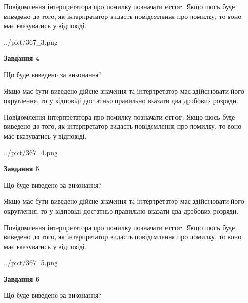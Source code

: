 \documentclass[12pt, ukrainian]{article}
\begin{document}
{\begin {Large}
Повідомлення інтерпретатора про помилку позначати \textbf{error}.
Якщо щось буде виведено до того, як інтерпретатор видасть повідомлення про помилку, 
то воно має вказуватись у відповіді. \par

\begin{center}
	{../pict/367_3.png}
\end{center}
\newpage

{\begin {center}\textbf{Завдання 4}\end {center}}\par
Що буде виведено за виконання? \par

Якщо має бути виведено дійсне значення та інтерпретатор має здійснювати його округлення, 
то у відповіді достатньо правильно вказати два дробових розряди.

Повідомлення інтерпретатора про помилку позначати \textbf{error}.
Якщо щось буде виведено до того, як інтерпретатор видасть повідомлення про помилку, 
то воно має вказуватись у відповіді. \par

\begin{center}
	{../pict/367_4.png}
\end{center}
\newpage

{\begin {center}\textbf{Завдання 5}\end {center}}\par
Що буде виведено за виконання? \par

Якщо має бути виведено дійсне значення та інтерпретатор має здійснювати його округлення, 
то у відповіді достатньо правильно вказати два дробових розряди.

Повідомлення інтерпретатора про помилку позначати \textbf{error}.
Якщо щось буде виведено до того, як інтерпретатор видасть повідомлення про помилку, 
то воно має вказуватись у відповіді. \par

\begin{center}
	{../pict/367_5.png}
\end{center}
\newpage

{\begin {center}\textbf{Завдання 6}\end {center}}\par
Що буде виведено за виконання? \par


\end{Large}}
\end{document}
